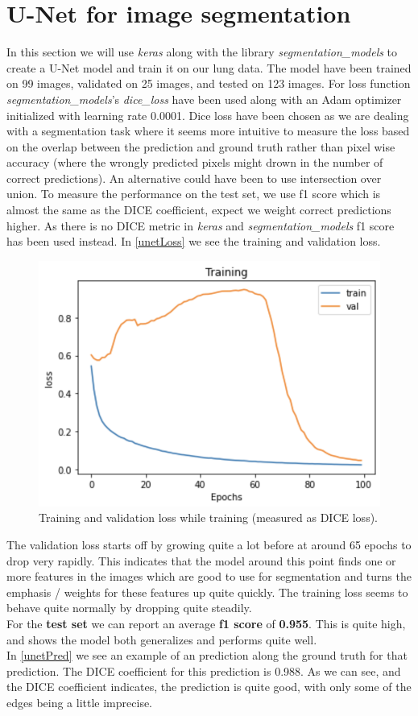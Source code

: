 \section{U-Net for image segmentation}
In this section we will use \textit{keras} along with the library \textit{segmentation\_models} to create a U-Net model and train it on our lung data. The model have been trained on 99 images, validated on 25 images, and tested on 123 images. For loss function \textit{segmentation\_models}'s \textit{dice\_loss} have been used along with an Adam optimizer initialized with learning rate 0.0001. Dice loss have been chosen as we are dealing with a segmentation task where it seems more intuitive to measure the loss based on the overlap between the prediction and ground truth rather than pixel wise accuracy (where the wrongly predicted pixels might drown in the number of correct predictions). An alternative could have been to use intersection over union. To measure the performance on the test set, we use f1 score which is almost the same as the DICE coefficient, expect we weight correct predictions higher. As there is no DICE metric in \textit{keras} and \textit{segmentation\_models} f1 score has been used instead. In \autoref{unetLoss} we see the training and validation loss.

\begin{figure}
	\centering
	\includegraphics[width=0.6\linewidth]{Materials/unetLoss}
	\caption{Training and validation loss while training (measured as DICE loss).}
	\label{unetLoss}
\end{figure}
The validation loss starts off by growing quite a lot before at around 65 epochs to drop very rapidly. This indicates that the model around this point finds one or more features in the images which are good to use for segmentation and turns the emphasis / weights for these features up quite quickly. The training loss seems to behave quite normally by dropping quite steadily.\\
For the \textbf{test set} we can report an average \textbf{f1 score} of \textbf{0.955}. This is quite high, and shows the model both generalizes and performs quite well.\\
In \autoref{unetPred} we see an example of an prediction along the ground truth for that prediction. The DICE coefficient for this prediction is 0.988. As we can see, and the DICE coefficient indicates, the prediction is quite good, with only some of the edges being a little imprecise.
 
